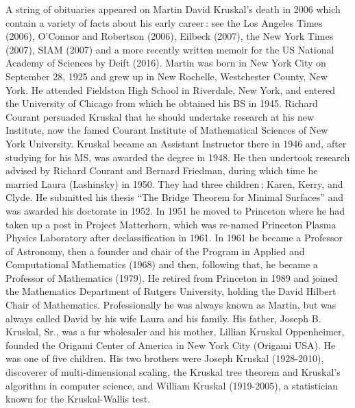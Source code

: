 \documentclass[11pt]{article}
\begin{document}
A string of obituaries appeared on Martin David Kruskal's death in 2006 which contain a variety of facts about his early career\,: see the Los Angeles Times (2006), O'Connor and Robertson (2006), Eilbeck (2007), the New York Times (2007), SIAM (2007) and a more recently written memoir for the US National Academy of Sciences by Deift (2016). Martin was born in New York City on September 28, 1925 and grew up in New Rochelle, Westchester County, New York. He attended Fieldston High School in Riverdale, New York, and entered the University of Chicago from which he obtained his BS in 1945. Richard Courant persuaded Kruskal that he should undertake research at his new Institute, now the famed Courant Institute of Mathematical Sciences of New York University. Kruskal became an Assistant Instructor there in 1946 and, after studying for his MS, was awarded the degree in 1948. He then undertook research advised by Richard Courant and Bernard Friedman, during which time he married Laura (Lashinsky) in 1950. They had three children\,: Karen, Kerry, and Clyde. He submitted his thesis ``The Bridge Theorem for Minimal Surfaces'' and was awarded his doctorate in 1952. In 1951 he moved to Princeton where he had taken up a post in Project Matterhorn, which was re-named Princeton Plasma Physics Laboratory after declassification in 1961. In 1961 he became a Professor of Astronomy, then a founder and chair of the Program in Applied and Computational Mathematics (1968) and then, following that, he became a Professor of Mathematics (1979). He retired from Princeton in 1989 and joined the Mathematics Department of Rutgers University, holding the David Hilbert Chair of Mathematics. Professionally he was always known as Martin, but was always called David by his wife Laura and his family. His father, Joseph B. Kruskal, Sr., was a fur wholesaler and his mother, Lillian Kruskal Oppenheimer, founded the Origami Center of America in New York City (Origami USA). He was one of five children. His two brothers were Joseph Kruskal (1928-2010), discoverer of multi-dimensional scaling, the Kruskal tree theorem and Kruskal's algorithm in computer science, and William Kruskal (1919-2005), a statistician known for the Kruskal-Wallis test.
 
\end{document}
